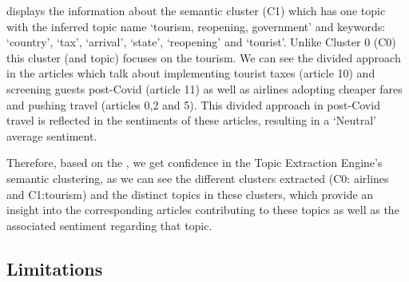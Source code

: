  displays the information about the semantic cluster (C1) which has one topic with the inferred topic name `tourism, reopening, government' and keywords: `country', `tax', `arrival', `state', `reopening' and `tourist'. Unlike Cluster 0 (C0) this cluster (and topic) focuses on the tourism. We can see the divided approach in the articles which talk about implementing tourist taxes (article 10) and screening guests post-Covid (article 11) as well as airlines adopting cheaper fares and pushing travel (articles 0,2 and 5). This divided approach in post-Covid travel is reflected in the sentiments of these articles, resulting in a `Neutral' average sentiment.

Therefore, based on the , we get confidence in the Topic Extraction Engine's semantic clustering, as we can see the different clusters extracted (C0: airlines and C1:tourism) and the distinct topics in these clusters, which provide an insight into the corresponding articles contributing to these topics as well as the associated sentiment regarding that topic. 

\subsection*{Limitations}
